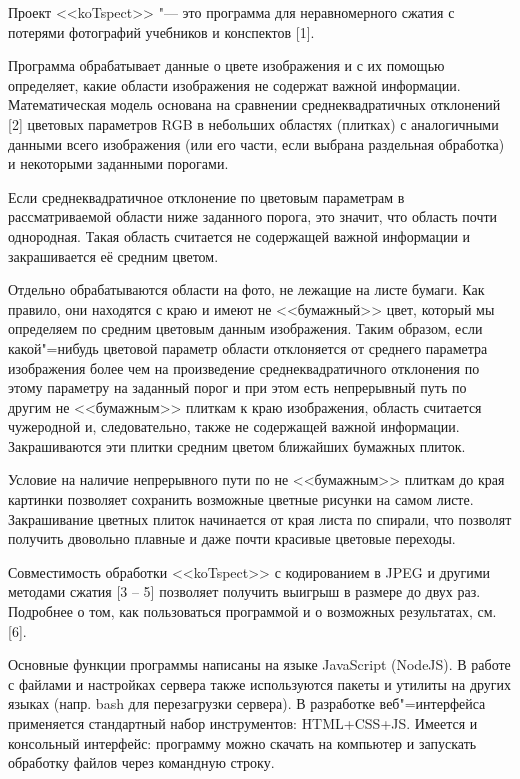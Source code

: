
\vzmscaption

Проект <<{koTspect}>> "--- это программа для неравномерного сжатия с потерями фотографий учебников и конспектов [1].

Программа обрабатывает данные о цвете изображения и с их помощью определяет, какие области изображения
не содержат важной информации. Математическая модель основана на сравнении среднеквадратичных отклонений [2]
цветовых параметров {RGB} в небольших областях (плитках) с аналогичными данными всего изображения (или его части, если выбрана
раздельная обработка) и некоторыми заданными порогами.

Если среднеквадратичное отклонение по цветовым параметрам в рассматриваемой области ниже заданного порога,
это значит, что область почти однородная. Такая область считается не содержащей важной информации и закрашивается её
средним цветом.

Отдельно обрабатываются области на фото, не лежащие на листе бумаги. Как правило, они находятся с краю и имеют
не <<бумажный>> цвет, который мы определяем по средним цветовым данным изображения. Таким образом, если какой"=нибудь
цветовой параметр области отклоняется от среднего параметра изображения более чем на произведение среднеквадратичного
отклонения по этому параметру на заданный порог и при этом есть непрерывный путь по другим не <<бумажным>> плиткам к
краю изображения, область считается чужеродной и, следовательно, также не содержащей важной информации. Закрашиваются
эти плитки средним цветом ближайших бумажных плиток.

Условие на наличие непрерывного пути по не <<бумажным>> плиткам до края картинки позволяет сохранить возможные цветные
рисунки на самом листе. Закрашивание цветных плиток начинается от края листа по спирали, что позволят получить
двовольно плавные и даже почти красивые цветовые переходы.

Совместимость обработки <<{koTspect}>> с кодированием в {JPEG} и другими методами сжатия [3 -- 5] позволяет получить выигрыш в размере
до двух раз. Подробнее о том, как пользоваться программой и о возможных результатах, см. [6].

Основные функции программы написаны на языке \foreignlanguage{english}{JavaScript (NodeJS)}. В работе с файлами и настройках сервера также используются
пакеты и утилиты на других языках (напр. \foreignlanguage{english}{bash} для перезагрузки сервера). В разработке веб"=интерфейса применяется стандартный
набор инструментов: \foreignlanguage{english}{HTML+CSS+JS}.
Имеется и консольный интерфейс: программу можно скачать на компьютер и запускать обработку файлов через командную строку.

